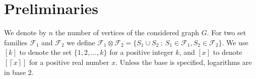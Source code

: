 \documentclass[11pt]{amsart}
\newcommand{\cal}{\mathcal}
\begin{document}

    









\section{Preliminaries}\label{sec:prelim}
We denote by $n$ the number of vertices of the considered graph $G$. For two set families ${\cal F}_1$ and ${\cal F}_2$ we define ${\cal F}_1 \otimes {\cal F}_2 = \{S_1 \cup S_2 ~:~ S_1 \in {\cal F}_1, S_2 \in {\cal F}_2\}$. 
%
We use $[k]$ to denote the set $\{1, 2, \dots, k\}$ for a positive integer $k$, and $[x]$ to denote $[\left\lceil x \right\rceil]$ for a positive real number $x$. 
%
Unless the base is specified, logarithms are in base $2$.
\end{document}
